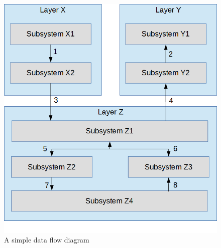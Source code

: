 

\begin{figure}[h!]
	\centering
 	\includegraphics[width=\textwidth]{images/data_flow}
 \caption{A simple data flow diagram}
\end{figure}
